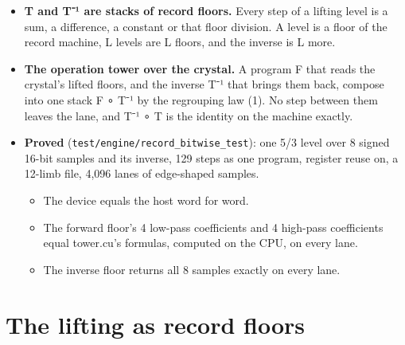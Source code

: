 \begin{itemize}
\begin{itemize}
\item The and reads v's two's complement without end. With the never-negative mask 2\textasciicircum{}k − 1 it gives v's residue modulo 2\textasciicircum{}k, in [0, 2\textasciicircum{}k), for a negative v as for a positive one.
\item v less its residue is a multiple of 2\textasciicircum{}k. The exact quotient divides it with nothing left over, and the quotient rounds toward −∞, as \texttt{tower\_\allowbreak{}floor\_\allowbreak{}shift} does.
\item The residue is no wider than the mask, k bits, by the never-negative width rule (3).
\end{itemize}
\item \textbf{T and T⁻¹ are stacks of record floors.} Every step of a lifting level is a sum, a difference, a constant or that floor division. A level is a floor of the record machine, L levels are L floors, and the inverse is L more.
\item \textbf{The operation tower over the crystal.} A program F that reads the crystal's lifted floors, and the inverse T⁻¹ that brings them back, compose into one stack F ∘ T⁻¹ by the regrouping law (1). No step between them leaves the lane, and T⁻¹ ∘ T is the identity on the machine exactly.
\item \textbf{Proved} (\texttt{test/\allowbreak{}engine/\allowbreak{}record\_\allowbreak{}bitwise\_\allowbreak{}test}): one 5/3 level over 8 signed 16-bit samples and its inverse, 129 steps as one program, register reuse on, a 12-limb file, 4,096 lanes of edge-shaped samples.

\begin{itemize}
\item The device equals the host word for word.
\item The forward floor's 4 low-pass coefficients and 4 high-pass coefficients equal tower.cu's formulas, computed on the CPU, on every lane.
\item The inverse floor returns all 8 samples exactly on every lane.
\end{itemize}
\end{itemize}

\section{\texorpdfstring{The lifting as record floors}{The lifting as record floors}}


